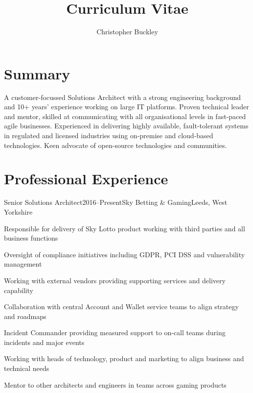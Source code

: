 \documentclass{cv}
\title{Curriculum Vitae}
\author{Christopher Buckley}
\begin{document}

\section{Summary}

A customer-focussed Solutions Architect with a strong engineering background and 10+ years'
experience working on large IT platforms. Proven technical leader and mentor, skilled at
communicating with all organisational levels in fast-paced agile businesses. Experienced in
delivering highly available, fault-tolerant systems in regulated and licensed industries using
on-premise and cloud-based technologies. Keen advocate of open-source technologies and communities.


\section{Professional Experience}

\begin{experience}{Senior Solutions Architect}{2016--Present}{Sky Betting \& Gaming}{Leeds, West Yorkshire}
\item Responsible for delivery of Sky Lotto product working with third parties and all business functions
\item Oversight of compliance initiatives including GDPR, PCI DSS and vulnerability management
\item Working with external vendors providing supporting services and delivery capability
\item Collaboration with central Account and Wallet service teams to align strategy and roadmaps
\item Incident Commander providing measured support to on-call teams during incidents and major events
\item Working with heads of technology, product and marketing to align business and technical needs
\item Mentor to other architects and engineers in teams across gaming products
\end{experience}
\end{document}
